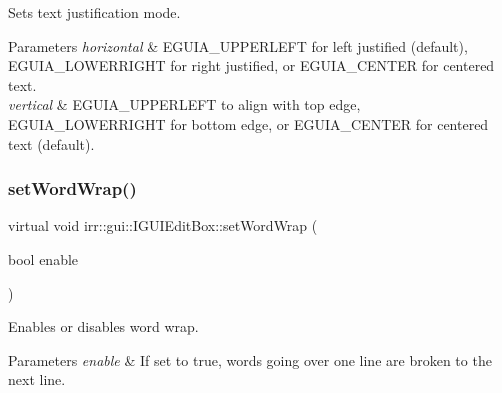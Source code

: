 Sets text justification mode. 


\begin{DoxyParams}{Parameters}
{\em horizontal} & E\+G\+U\+I\+A\+\_\+\+U\+P\+P\+E\+R\+L\+E\+FT for left justified (default), E\+G\+U\+I\+A\+\_\+\+L\+O\+W\+E\+R\+R\+I\+G\+HT for right justified, or E\+G\+U\+I\+A\+\_\+\+C\+E\+N\+T\+ER for centered text. \\
\hline
{\em vertical} & E\+G\+U\+I\+A\+\_\+\+U\+P\+P\+E\+R\+L\+E\+FT to align with top edge, E\+G\+U\+I\+A\+\_\+\+L\+O\+W\+E\+R\+R\+I\+G\+HT for bottom edge, or E\+G\+U\+I\+A\+\_\+\+C\+E\+N\+T\+ER for centered text (default). \\
\hline
\end{DoxyParams}
\mbox{\label{classirr_1_1gui_1_1IGUIEditBox_aa020a985b38d293794b73e6e12dafd7c}} 
\subsubsection{\texorpdfstring{set\+Word\+Wrap()}{setWordWrap()}\hspace{0.1cm}{\footnotesize\ttfamily [1/2]}}
{\footnotesize\ttfamily virtual void irr\+::gui\+::\+I\+G\+U\+I\+Edit\+Box\+::set\+Word\+Wrap (\begin{DoxyParamCaption}\item[{bool}]{enable }\end{DoxyParamCaption})\hspace{0.3cm}{\ttfamily [pure virtual]}}



Enables or disables word wrap. 


\begin{DoxyParams}{Parameters}
{\em enable} & If set to true, words going over one line are broken to the next line. \\
\hline
\end{DoxyParams}
\mbox{\label{classirr_1_1gui_1_1IGUIEditBox_aa020a985b38d293794b73e6e12dafd7c}} 
